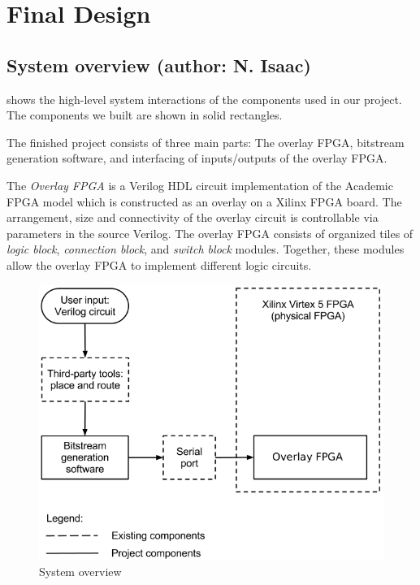 \section{Final Design}


\subsection{System overview (author: N. Isaac)}
\label{system-overview}

 shows the high-level system interactions of the components used in our project.
The components we built are shown in solid rectangles.

The finished project consists of three main parts: The overlay FPGA, bitstream generation software, and interfacing of inputs/outputs of the overlay FPGA.

The \emph{Overlay FPGA} is a Verilog HDL circuit implementation of the Academic FPGA model which is constructed as an overlay on a Xilinx FPGA board.
The arrangement, size and connectivity of the overlay circuit is controllable via parameters in the source Verilog.
The overlay FPGA consists of organized tiles of \emph{logic block}, \emph{connection block}, and \emph{switch block} modules.
Together, these modules allow the overlay FPGA to implement different logic circuits.

\begin{figure}[!h]
	\centering
	\includegraphics[scale=0.6]{system.png}
	\caption{System overview}
	\label{system-diagram}
\end{figure}

